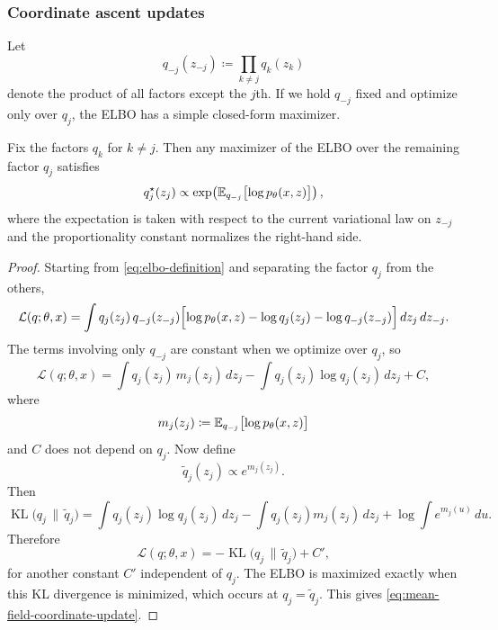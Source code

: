 \subsubsection{Coordinate ascent updates}
\label{subsubsec:cavi-updates}

Let
\[
  q_{-j}(z_{-j})
  \coloneqq
  \prod_{k\ne j} q_k(z_k)
\]
denote the product of all factors except the $j$th.
If we hold $q_{-j}$ fixed and optimize only over $q_j$, the ELBO has a simple closed-form maximizer.

\begin{proposition}
\label{prop:mean-field-update}
Fix the factors $q_k$ for $k\ne j$.
Then any maximizer of the ELBO over the remaining factor $q_j$ satisfies
\begin{equation}
  q_j^\star(z_j)
  \propto
  \exp\!\left(
    \mathbb{E}_{q_{-j}}\bigl[\log p_\theta(x,z)\bigr]
  \right),
  \label{eq:mean-field-coordinate-update}
\end{equation}
where the expectation is taken with respect to the current variational law on $z_{-j}$ and the proportionality constant normalizes the right-hand side.
\end{proposition}
\begin{proof}
Starting from \eqref{eq:elbo-definition} and separating the factor $q_j$ from the others,
\[
  \mathcal{L}(q;\theta,x)
  =
  \int q_j(z_j)\,q_{-j}(z_{-j})
  \Bigl[\log p_\theta(x,z) - \log q_j(z_j) - \log q_{-j}(z_{-j})\Bigr]
  \,dz_j\,dz_{-j}.
\]
The terms involving only $q_{-j}$ are constant when we optimize over $q_j$, so
\[
  \mathcal{L}(q;\theta,x)
  =
  \int q_j(z_j)\,m_j(z_j)\,dz_j
  -
  \int q_j(z_j)\log q_j(z_j)\,dz_j
  + C,
\]
where
\[
  m_j(z_j)
  \coloneqq
  \mathbb{E}_{q_{-j}}\bigl[\log p_\theta(x,z)\bigr]
\]
and $C$ does not depend on $q_j$.
Now define
\[
  \widetilde q_j(z_j)
  \propto
  e^{m_j(z_j)}.
\]
Then
\[
  \operatorname{KL}\!\bigl(q_j\,\|\,\widetilde q_j\bigr)
  =
  \int q_j(z_j)\log q_j(z_j)\,dz_j
  -
  \int q_j(z_j)m_j(z_j)\,dz_j
  +
  \log \int e^{m_j(u)}\,du.
\]
Therefore
\[
  \mathcal{L}(q;\theta,x)
  =
  -\operatorname{KL}\!\bigl(q_j\,\|\,\widetilde q_j\bigr)
  + C',
\]
for another constant $C'$ independent of $q_j$.
The ELBO is maximized exactly when this KL divergence is minimized, which occurs at $q_j=\widetilde q_j$.
This gives \eqref{eq:mean-field-coordinate-update}.%
\end{proof}


